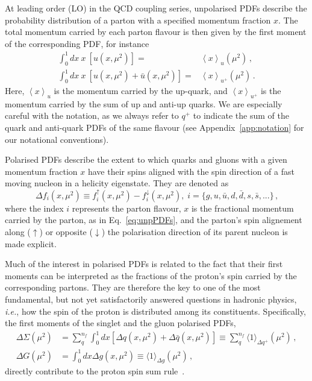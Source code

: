 At leading order (LO) in the QCD coupling series, unpolarised PDFs 
describe the probability distribution of a parton with a specified 
momentum fraction $x$.
%
The total momentum carried by each parton flavour is then given by 
the first moment of the corresponding PDF, for instance
%
\begin{align}
\int_{0}^{1}dx\ x\ \left[u(x,\mu^2)\right] 
= & {}  
\left\langle x\right\rangle _{u}(\mu^2)\,, \label{eq:umoment1}\\
\int_{0}^{1}dx\ x\ \left[u(x,\mu^2)+\bar{u}(x,\mu^2)\right] 
= & {} 
\left\langle x\right\rangle _{u^{+}}(\mu^2)\,. \label{eq:uplusmoment1}
\end{align}
%
Here, $\left\langle x\right\rangle _{u}$ is the momentum
carried by the up-quark, and $\left\langle x\right\rangle _{u^{+}}$ is
the momentum carried by the sum of up and anti-up quarks.
%
We are especially careful with the notation, as we always refer to $q^+$ to 
indicate the sum of the quark and anti-quark PDFs of the same flavour (see
Appendix~\ref{app:notation} for our notational conventions).

Polarised PDFs describe the extent to which quarks and gluons 
with a given momentum fraction $x$ have their spins aligned with the spin 
direction of a fast moving nucleon in a helicity eigenstate. 
%
They are denoted as 
\begin{equation}
\Delta f_i(x,\mu^2) \equiv f_i^{\uparrow}(x,\mu^2) - f_i^{\downarrow}(x,\mu^2)
\mbox{,} \ \ i=\{g,u,\bar{u},d,\bar{d},s,\bar{s},...\}
\,\mbox{,}
\label{eq:polPDFs}
\end{equation}
where the index $i$ represents the parton flavour, $x$ is the fractional 
momentum carried by the parton, as in Eq.~\eqref{eq:unpPDFs},  
and the parton's spin alignement along ($\uparrow$) or opposite 
($\downarrow$) the polarisation direction of its parent nucleon
is made explicit.

Much of the interest in polarised PDFs is related to the fact that 
their first moments can be interpreted as the fractions of the proton's 
spin carried by the corresponding partons.
%
They are therefore the key to one of the most fundamental, 
but not yet satisfactorily answered questions in hadronic physics,
{\it i.e.}, how the spin of the proton is distributed among its constituents.
%
Specifically, the first moments of the singlet and the gluon polarised PDFs,
\begin{align}
\Delta\Sigma(\mu^2)
& =
\sum_{q}^{n_f}\int_0^1 dx 
\left[\Delta q(x, \mu^2) + \Delta\bar{q}(x, \mu^2)\right]
\equiv
\sum_q^{n_f}\langle 1 \rangle_{\Delta q^+}(\mu^2)\,,
\\
\Delta G(\mu^2)
& =
\int_0^1 dx \Delta g(x,\mu^2)
\equiv
\langle 1 \rangle_{\Delta g}(\mu^2)
\,,
\label{eq:moments}
\end{align}
directly contribute to the proton spin sum rule~\cite{Leader:2013jra}.

